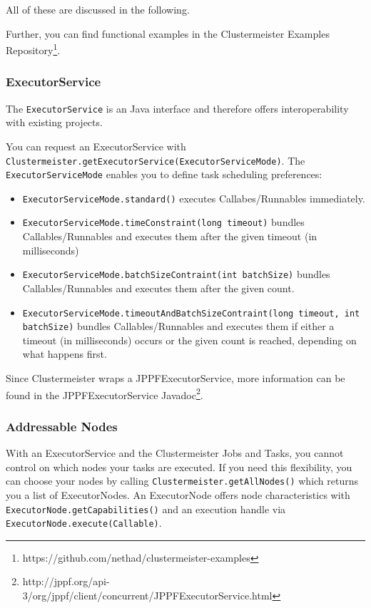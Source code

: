 \documentclass{article}
\begin{document}
All of these are discussed in the following.

Further, you can find functional examples in the Clustermeister Examples Repository\footnote{https://github.com/nethad/clustermeister-examples}.

\subsubsection{ExecutorService}

The \texttt{ExecutorService} is an Java interface and therefore offers interoperability with existing projects.

You can request an ExecutorService with \texttt{Clustermeister.getExecutorService(ExecutorServiceMode)}. The \texttt{ExecutorServiceMode} enables you to define task scheduling preferences:

\begin{itemize}
 \item \texttt{ExecutorServiceMode.standard()} executes Callabes/Runnables immediately.
 \item \texttt{ExecutorServiceMode.timeConstraint(long timeout)} bundles Callables/Runnables and executes them after the given timeout (in milliseconds)
 \item \texttt{ExecutorServiceMode.batchSizeContraint(int batchSize)} bundles Callables/Runnables and executes them after the given count.
 \item \texttt{ExecutorServiceMode.timeoutAndBatchSizeContraint(long timeout, int batchSize)} bundles Callables/Runnables and executes them if either a timeout (in milliseconds) occurs or the given count is reached, depending on what happens first.
\end{itemize}

Since Clustermeister wraps a JPPFExecutorService, more information can be found in the JPPFExecutorService Javadoc\footnote{http://jppf.org/api-3/org/jppf/client/concurrent/JPPFExecutorService.html}.

\subsubsection{Addressable Nodes}

With an ExecutorService and the Clustermeister Jobs and Tasks, you cannot control on which nodes your tasks are executed. If you need this flexibility, you can choose your nodes by calling \texttt{Clustermeister.getAllNodes()} which returns you a list of ExecutorNodes. An ExecutorNode offers node characteristics with \texttt{ExecutorNode.getCapabilities()} and an execution handle via \texttt{ExecutorNode.execute(Callable)}.
\end{document}
